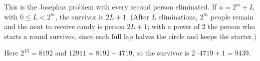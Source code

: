 This is the Josephus problem with every second person eliminated. If $n=2^m+L$ with $0\le L<2^m$, the survivor is $2L+1$. (After $L$ eliminations, $2^m$ people remain and the next to receive candy is person $2L+1$; with a power of $2$ the person who starts a round survives, since each full lap halves the circle and keeps the starter.)

Here $2^{13}=8192$ and $12911=8192+4719$, so the survivor is $2\cdot4719+1=\boxed{9439}$.
